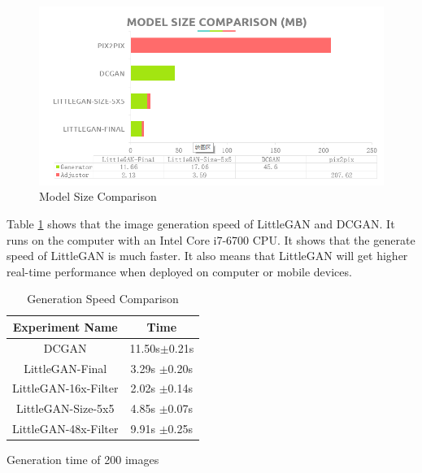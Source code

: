     \begin{figure}
        \begin{center}
        \includegraphics[width=\textwidth]{figures/result_model_size.png}
        \caption{Model Size Comparison}
        \label{result_model_size}
        \end{center}
    \end{figure}

Table \ref{result_speed} shows that the image generation speed of LittleGAN and DCGAN.
It runs on the computer with an Intel Core i7-6700 CPU.
It shows that the generate speed of LittleGAN is much faster.
It also means that LittleGAN will get higher real-time performance when deployed on computer or mobile devices.

    \begin{table}
        \caption{Generation Speed Comparison}
        \label{result_speed}
        \centering
        \begin{threeparttable}
            \begin{tabular}{c|c}
                \hline
                Experiment Name     & Time              \\ \hline
                DCGAN               & 11.50s$\pm$0.21s  \\
                LittleGAN-Final     & 3.29s $\pm$0.20s  \\
                LittleGAN-16x-Filter& 2.02s $\pm$0.14s  \\
                LittleGAN-Size-5x5  & 4.85s $\pm$0.07s  \\
                LittleGAN-48x-Filter& 9.91s $\pm$0.25s  \\ \hline
            \end{tabular}
            \begin{tablenotes}
                \item Generation time of 200 images
            \end{tablenotes}
        \end{threeparttable}
    \end{table}


